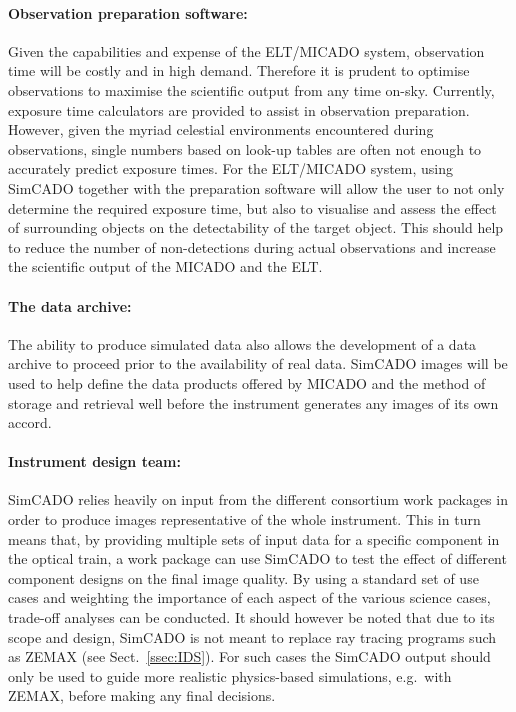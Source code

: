 \paragraph{Observation preparation software:} Given the capabilities and expense of the ELT/MICADO system, observation time will be costly and in high demand. Therefore it is prudent to optimise observations to maximise the scientific output from any time on-sky. Currently, exposure time calculators are provided to assist in observation preparation. However, given the myriad celestial environments encountered during observations, single numbers based on look-up tables are often not enough to accurately predict exposure times. For the ELT/MICADO system, using SimCADO together with the preparation software will allow the user to not only determine the required exposure time, but also to visualise and assess the effect of surrounding objects on the detectability of the target object. This should help to reduce the number of non-detections during actual observations and increase the scientific output of the MICADO and the ELT.

\paragraph{The data archive:} The ability to produce simulated data also allows the development of a data archive to proceed prior to the availability of real data. SimCADO images will be used to help define the data products offered by MICADO and the method of storage and retrieval well before the instrument generates any images of its own accord.
  
\paragraph{Instrument design team:} SimCADO relies heavily on input from the different consortium work packages in order to produce images representative of the whole instrument. This in turn means that, by providing multiple sets of input data for a specific component in the optical train, a work package can use SimCADO to test the effect of different component designs on the final image quality. By using a standard set of use cases and weighting the importance of each aspect of the various science cases, trade-off analyses can be conducted. It should however be noted that due to its scope and design, SimCADO is not meant to replace ray tracing programs such as ZEMAX (see Sect.~\ref{ssec:IDS}). For such cases the SimCADO output should only be used to guide more realistic physics-based simulations, e.g.\ with ZEMAX, before making any final decisions.
  
